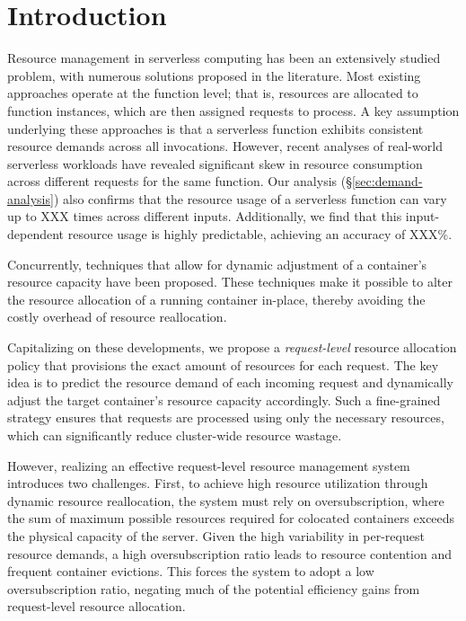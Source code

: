 \section{Introduction}
\label{sec:introduction}


Resource management in serverless computing has been an extensively studied problem, with numerous solutions proposed in the literature.
Most existing approaches operate at the function level; that is, resources are allocated to function instances, which are then assigned requests to process.
A key assumption underlying these approaches is that a serverless function exhibits consistent resource demands across all invocations.
However, recent analyses of real-world serverless workloads have revealed significant skew in resource consumption across different requests for the same function.
Our analysis (\S\ref{sec:demand-analysis}) also confirms that the resource usage of a serverless function can vary up to XXX times across different inputs.
Additionally, we find that this input-dependent resource usage is highly predictable, achieving an accuracy of XXX\%.

Concurrently, techniques that allow for dynamic adjustment of a container's resource capacity have been proposed.
These techniques make it possible to alter the resource allocation of a running container in-place, thereby avoiding the costly overhead of resource reallocation.

Capitalizing on these developments, we propose a \textit{request-level} resource allocation policy that provisions the exact amount of resources for each request.
The key idea is to predict the resource demand of each incoming request and dynamically adjust the target container's resource capacity accordingly.
Such a fine-grained strategy ensures that requests are processed using only the necessary resources, which can significantly reduce cluster-wide resource wastage.

However, realizing an effective request-level resource management system introduces two challenges.
First, to achieve high resource utilization through dynamic resource reallocation, the system must rely on oversubscription,
where the sum of maximum possible resources required for colocated containers exceeds the physical capacity of the server.
Given the high variability in per-request resource demands, a high oversubscription ratio leads to resource contention and frequent container evictions.
This forces the system to adopt a low oversubscription ratio, negating much of the potential efficiency gains from request-level resource allocation.

